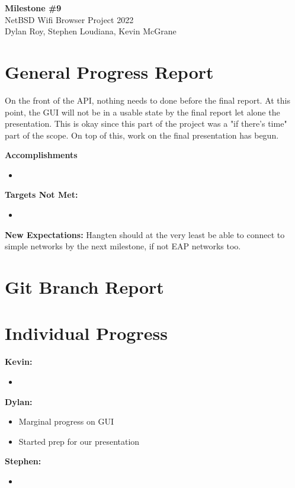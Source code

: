 \documentclass[11pt]{article}
\begin{document}
\begin{center}
  \textbf{\Large Milestone \#9}\\\large NetBSD Wifi Browser Project 2022\\
  Dylan Roy, Stephen Loudiana, Kevin McGrane
\end{center}

\section{General Progress Report}
On the front of the API, nothing needs to done before the final report.
At this point, the GUI will not be in a usable state by the final report
let alone the presentation.
This is okay since this part of the project was a "if there's time" part
of the scope.
On top of this, work on the final presentation has begun.

\textbf{Accomplishments}
\begin{itemize}
  \item
\end{itemize}

\textbf{Targets Not Met:}
\begin{itemize}
  \item
\end{itemize}

\textbf{New Expectations:}
Hangten should at the very least be able to connect to simple networks by the
next milestone, if not EAP networks too.

\section{Git Branch Report}

\newpage
\section{Individual Progress}

\textbf{Kevin:}
\begin{itemize}
  \item
\end{itemize}

\textbf{Dylan:}
\begin{itemize}
  \item Marginal progress on GUI
  \item Started prep for our presentation
\end{itemize}

\textbf{Stephen:}
\begin{itemize}
  \item 
\end{itemize}
\end{document}
